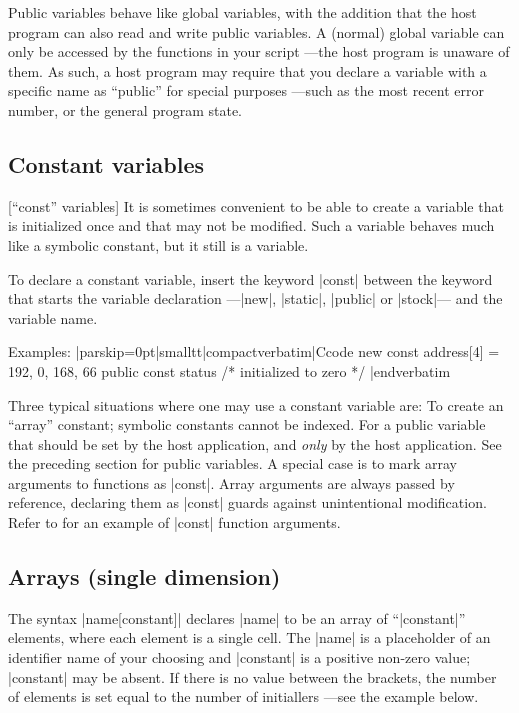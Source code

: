 %
Public variables behave like global variables, with the addition that the
host program can also read and write public variables. A (normal) global
variable can only be accessed by the functions in your script ---the host
program is unaware of them. As such, a host program may require that you
declare a variable with a specific name as ``public'' for special purposes
---such as the most recent error number, or the general program state.


\subsection{Constant variables}
 [``const'' variables]
\noindent{}%
It is sometimes convenient to be able to create a variable that is
initialized once and that may not be modified. Such a variable behaves much
like a symbolic constant, but it still is a variable.

To declare a constant variable, insert the keyword |const| between the keyword
that starts the variable declaration ---|new|, |static|, |public| or |stock|---
and the variable name.

\goodbreak
Examples:
\listingx\verbatim|parskip=0pt|smalltt|compactverbatim|Ccode
new const address[4] = { 192, 0, 168, 66 }
public const status               /* initialized to zero */
|endverbatim\endlistingx

Three typical situations where one may use a constant variable are:
\beginlist{1em}\compactlist
\list{\lbullet}
  To create an ``array'' constant; symbolic constants cannot be indexed.
\list{\lbullet}
  For a public variable that should be set by the host application, and
  {\it only\/} by the host application. See the preceding section for public
  variables.
\list{\lbullet}
  A special case is to mark array arguments to functions as |const|. Array
  arguments are always passed by reference, declaring them as |const| guards
  against unintentional modification. Refer to  for an
  example of |const| function arguments.
\endlist


\subsection{Arrays (single dimension)}
\noindent{}%
The syntax |name[constant]| declares |name| to be an array of ``|constant|''
elements, where each element is a single cell. The |name| is a placeholder of
an identifier name of your choosing and |constant| is a positive non-zero
value; |constant| may be absent. If there is no value between the brackets, the
number of elements is set equal to the number of initiallers ---see the example
below.

